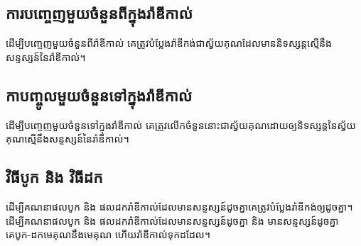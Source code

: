 \subsection{ការបញ្ចេញមួយចំនួនពីក្នុងរ៉ាឌីកាល់}
\begin{generality}
ដើម្បីបញ្ចេញមួយចំនួនពីរ៉ាឌីកាល់ គេត្រូវបំប្លែងរ៉ាឌីកង់ជាស្វ័យគុណដែលមាននិទស្សន្តស្មើនឹងសន្ទស្សន៍នៃរ៉ាឌីកាល់។
\end{generality}

\subsection{កាបញ្ចូលមួយចំនួនទៅក្នុងរ៉ាឌីកាល់}
\begin{generality}
ដើម្បីបញ្ចេញមួយចំនួនទៅក្នុងរ៉ាឌីកាល់ គេត្រូវលើកចំនួននោះជាស្វ័យគុណដោយឲ្យនិទស្សន្តនៃស្វ័យគុណស្មើនឹងសន្ទស្សន៍នៃរ៉ាឌីកាល់។
\end{generality}
\subsection{វិធីបូក និង វិធីដក}

\begin{generality}
ដើម្បីគណនាផលបូក និង ផលដករ៉ាឌីកាល់ដែលមានសន្ទស្សន៍ដូចគ្នាគេត្រូវបំប្លែងរ៉ាឌីកង់ឲ្យដូចគ្នា។ 
ដើម្បីគណនាផលបូក និង ផលដករ៉ាឌីកាល់ដែលមានសន្ទស្សន៍ដូចគ្នា និង មានសន្ទស្សន៍ដូចគ្នា គេបូក-ដកមេគុណនឹងមេគុណ ហើយរ៉ាឌីកាល់ទុកដដែល។
\end{generality}
\newpage

